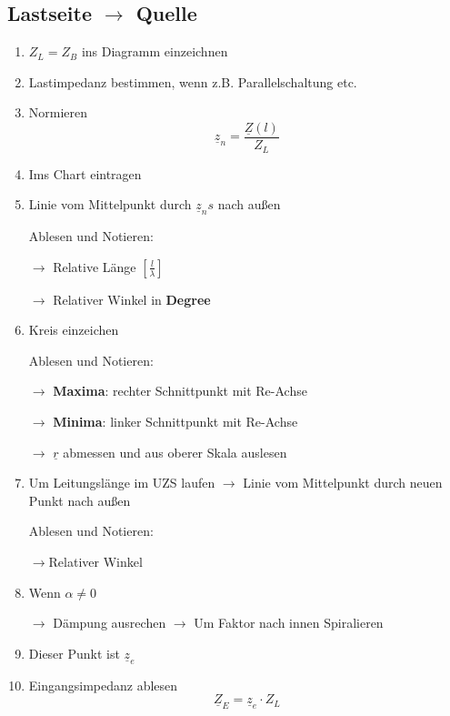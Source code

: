 \subsection[Von Last zu Quelle]{Lastseite $\rightarrow$ Quelle}
\begin{enumerate}
    \item $Z_L = Z_B$ ins Diagramm einzeichnen
    \item Lastimpedanz bestimmen,
          wenn z.B. Parallelschaltung etc.
    \item Normieren
          \[\underline{z}_n = \frac{\underline{Z}(l)}{Z_L} \]
    \item Ims Chart eintragen
    \item Linie vom Mittelpunkt durch $\underline{z}_ns$ nach außen

          Ablesen und Notieren:

          $\rightarrow$ Relative Länge $\left[\frac{l}{\lambda}\right]$

          $\rightarrow$ Relativer Winkel in \textbf{Degree}
    \item Kreis einzeichen

          Ablesen und Notieren:

          $\rightarrow$ \textbf{Maxima}: rechter Schnittpunkt mit Re-Achse

          $\rightarrow$ \textbf{Minima}: linker Schnittpunkt mit Re-Achse

          $\rightarrow$ $ \underline{r} $ abmessen und aus oberer Skala auslesen
    \item Um Leitungslänge im UZS laufen
          $\rightarrow$ Linie vom Mittelpunkt durch neuen Punkt nach außen

          Ablesen und Notieren:

          $\rightarrow$Relativer Winkel
    \item Wenn $\alpha\neq 0$

          $\rightarrow$ Dämpung ausrechen
          $\rightarrow$ Um Faktor nach innen Spiralieren

    \item Dieser Punkt ist $\underline{z}_e$
    \item Eingangsimpedanz ablesen
          \[\underline{Z}_E = \underline{z}_e \cdot Z_L\]
\end{enumerate}
  